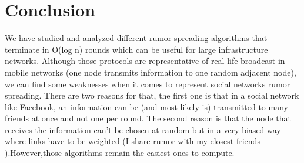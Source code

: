 \documentclass[10pt,journal,a4paper]{IEEEtran}
\begin{document}
\section{Conclusion}
 We have studied and analyzed different rumor spreading algorithms that terminate in O(log n) rounds which can be useful for large infrastructure networks. Although those protocols are representative of real life broadcast in mobile networks (one node transmits information to one random adjacent node), we can find some weaknesses when it comes to represent social networks rumor spreading. There are two reasons for that, the first one is that in a social network like Facebook, an information can be (and most likely is) transmitted to many friends at once and not one per round. The second reason is that the node that receives the information can’t be chosen at random but in a very biased way where links have to be weighted (I share rumor with my closest friends ).However,those algorithms remain the easiest ones to compute.
\end{document}

